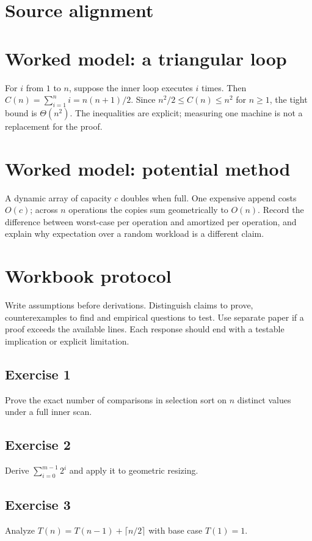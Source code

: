 \documentclass[11pt,letterpaper]{article}
\begin{document}
\tableofcontents
\clearpage
{}
\section{Source alignment}

\section{Worked model: a triangular loop}
For $i$ from $1$ to $n$, suppose the inner loop executes $i$ times. Then $C(n)=\sum_{i=1}^{n}i=n(n+1)/2$. Since $n^2/2\le C(n)\le n^2$ for $n\ge1$, the tight bound is $\Theta(n^2)$. The inequalities are explicit; measuring one machine is not a replacement for the proof.
\section{Worked model: potential method}
A dynamic array of capacity $c$ doubles when full. One expensive append costs $O(c)$; across $n$ operations the copies sum geometrically to $O(n)$. Record the difference between worst-case per operation and amortized per operation, and explain why expectation over a random workload is a different claim.

\section{Workbook protocol}
Write assumptions before derivations. Distinguish claims to prove, counterexamples to find and empirical questions to test. Use separate paper if a proof exceeds the available lines. Each response should end with a testable implication or explicit limitation.

\subsection{Exercise 1}\noindent Prove the exact number of comparisons in selection sort on $n$ distinct values under a full inner scan.
\subsection{Exercise 2}\noindent Derive $\sum_{i=0}^{m-1}2^i$ and apply it to geometric resizing.
\subsection{Exercise 3}\noindent Analyze $T(n)=T(n-1)+\lceil n/2\rceil$ with base case $T(1)=1$.
\end{document}
